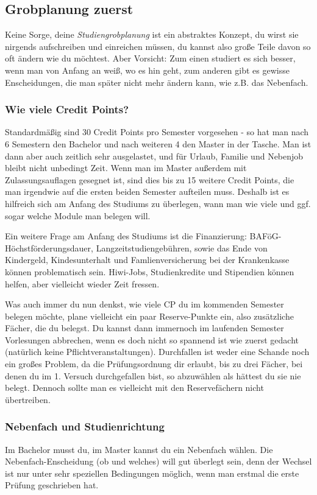 \subsection{Grobplanung zuerst}
\label{grob}
	Keine Sorge, deine \textit{Studiengrobplanung} ist ein abstraktes Konzept, du wirst sie nirgends aufschreiben und einreichen müssen, du kannst also große Teile davon so oft ändern wie du möchtest. Aber Vorsicht: Zum einen studiert es sich besser, wenn man von Anfang an weiß, wo es hin geht, zum anderen gibt es gewisse Enscheidungen, die man später nicht mehr ändern kann, wie z.B. das Nebenfach.

\subsubsection{Wie viele Credit Points?}
	Standardmäßig sind 30 Credit Points pro Semester vorgesehen - so hat man nach 6 Semestern den Bachelor und nach weiteren 4 den Master in der Tasche. Man ist dann aber auch zeitlich sehr ausgelastet, und für Urlaub, Familie und Nebenjob bleibt nicht unbedingt Zeit. Wenn man im Master außerdem mit Zulassungsauflagen gesegnet ist, sind dies bis zu 15 weitere Credit Points, die man irgendwie auf die ersten beiden Semester aufteilen muss. Deshalb ist es hilfreich sich am Anfang des Studiums zu überlegen, wann man wie viele und ggf. sogar welche Module man belegen will.

	Ein weitere Frage am Anfang des Studiums ist die Finanzierung:
	BAFöG-Höchstförderungsdauer, Langzeitstudiengebühren, sowie das
	Ende von Kindergeld, Kindesunterhalt und Famlienversicherung bei
	der Krankenkasse können problematisch sein. Hiwi-Jobs,
	Studienkredite und Stipendien können helfen, aber vielleicht
	wieder Zeit fressen. 

	Was auch immer du nun denkst, wie viele CP du im kommenden Semester belegen möchte, plane vielleicht ein paar Reserve-Punkte ein, also zusätzliche Fächer, die du belegst. Du kannst dann immernoch im laufenden Semester Vorlesungen abbrechen, wenn es doch nicht so spannend ist wie zuerst gedacht (natürlich keine Pflichtveranstaltungen). Durchfallen ist weder eine Schande noch ein großes Problem, da die Prüfungsordnung dir erlaubt, bis zu drei Fächer, bei denen du im 1. Versuch durchgefallen bist, so abzuwählen als hättest du sie nie belegt. Dennoch sollte man es vielleicht mit den Reservefächern nicht übertreiben.

\subsubsection{Nebenfach und Studienrichtung}
\label{nebenfach}
	Im Bachelor musst du, im Master kannst du ein Nebenfach wählen. Die Nebenfach-Enscheidung (ob und welches) will gut überlegt sein, denn der Wechsel ist nur unter sehr speziellen Bedingungen möglich, wenn man erstmal die erste Prüfung geschrieben hat.
 

